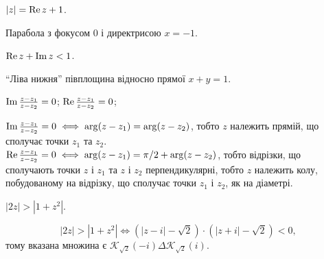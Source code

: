 \begin{problem}
	$|z| = \operatorname{Re} z + 1$.
\end{problem}
\begin{solution} %
	Парабола з фокусом 0 і директрисою $x = -1$.
\end{solution}

\begin{problem}
	$\operatorname{Re} z + \operatorname{Im} z < 1$.
\end{problem}
\begin{solution} %
	``Ліва нижня'' півплощина відносно прямої $x + y = 1$.
\end{solution}

\begin{problem}
	$\operatorname{Im} \frac{z-z_1}{z-z_2}=0$; $\operatorname{Re} \frac{z-z_1}{z-z_2}=0$;
\end{problem}
\begin{solution} %
	$\operatorname{Im} \frac{z-z_1}{z-z_2}=0 \iff \arg (z - z_1) = \arg (z - z_2)$, тобто $z$ належить прямій, що сполучає точки $z_1$ та $z_2$. \\

	$\operatorname{Re} \frac{z-z_1}{z-z_2}=0 \iff \arg(z-z_1)=\pi/2+\arg(z-z_2)$, тобто відрізки, що сполучають точки $z$ і $z_1$ та $z$ і $z_2$ перпендикулярні, тобто $z$ належить колу, побудованому на відрізку, що сполучає точки $z_1$ і $z_2$, як на діаметрі. 
\end{solution}

\begin{problem}
	$|2z| > |1+z^2|$.
\end{problem}
\begin{solution}
	\[|2z| > |1+z^2| \iff \left(|z - i| - \sqrt{2}\right) \cdot \left(|z + i| - \sqrt{2}\right) < 0,\] тому вказана множина є $\mathcal{K}_{\sqrt{2}}(-i) \Delta \mathcal{K}_{\sqrt{2}}(i)$.
\end{solution}

